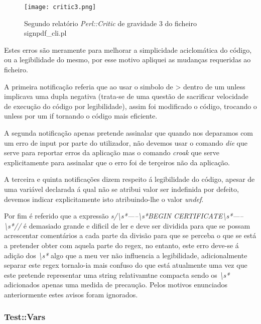 \begin{figure}[H]

  \centering
  \captionsetup{justification=centering}

  \texttt{[image: critic3.png]}
  
  \caption {Segundo relatório \textit{Perl::Critic} de gravidade 3 do ficheiro signpdf\_cli.pl}

\end{figure}
\par Estes erros são meramente para melhorar a simplicidade aciclomática do código, ou a legibilidade do mesmo, por esse motivo apliquei as mudanças requeridas ao ficheiro.
\par A primeira notificação referia que ao usar o simbolo de > dentro de um unless implicava uma dupla negativa (trata-se de uma questão de sacrificar velocidade de execução do código por legibilidade), assim foi modificado o código, trocando o unless por um if tornando o código mais eficiente.
\par A segunda notificação apenas pretende assinalar que quando nos deparamos com um erro de input por parte do utilizador, não devemos usar o comando \textit{die} que serve para reportar erros da aplicação mas o comando \textit{croak} que serve explicitamente para assinalar que o erro foi de terçeiros não da aplicação.
\par A terceira e quinta notificações dizem respeito á legibilidade do código, apesar de uma variável declarada á qual não se atribui valor ser indefinida por defeito, devemos indicar explicitamente isto atribuindo-lhe o valor \textit{undef}.\newline
\par Por fim é referido que a expressão \textit{s/\textbackslash s*-----\textbackslash s*BEGIN CERTIFICATE\textbackslash s*-----\textbackslash s*//} é demasiado grande e dificil de ler e deve ser dividida para que se possam acrescentar comentários a cada parte da divisão para que se perceba o que se está a pretender obter com aquela parte do regex, no entanto, este erro deve-se á adição dos \textit{\textbackslash s*} algo que a meu ver não influencia a legibilidade, adicionalmente separar este regex tornalo-ia mais confuso do que está atualmente uma vez que este pretende representar uma string relativamtne compacta sendo os \textit{\textbackslash s*} adicionados apenas uma medida de precaução. Pelos motivos enunciados anteriormente estes avisos foram ignorados.
\hfill\newpage

\subsubsection{Test::Vars}
\hfill\newline

